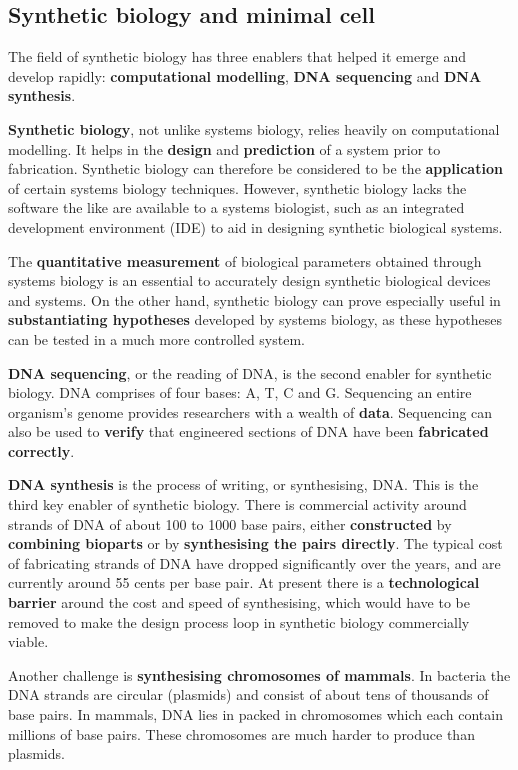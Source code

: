 \documentclass[10pt,a4paper]{report}
\begin{document}
	\subsection{Synthetic biology and minimal cell}
	The field of synthetic biology has three enablers that helped it emerge and develop rapidly: \textbf{computational modelling}, \textbf{DNA sequencing} and \textbf{DNA synthesis}.
	
	\textbf{Synthetic biology}, not unlike systems biology, relies heavily on computational modelling. 
	It helps in the \textbf{design} and \textbf{prediction} of a system prior to fabrication. 
	Synthetic biology can therefore be considered to be the \textbf{application} of certain systems biology techniques. 
	However, synthetic biology lacks the software the like are available to a systems biologist, such as an integrated development environment (IDE) to aid in designing synthetic biological systems.
	
	The \textbf{quantitative measurement} of biological parameters obtained through systems biology is an essential to accurately design synthetic biological devices and systems. On the other hand, synthetic biology can prove especially useful in \textbf{substantiating hypotheses} developed by systems biology, as these hypotheses can be tested in a much more controlled system.
	
	\textbf{DNA sequencing}, or the reading of DNA, is the second enabler for synthetic biology. DNA comprises of four bases: A, T, C and G. 
	Sequencing an entire organism’s genome provides researchers with a wealth of \textbf{data}. 
	Sequencing can also be used to \textbf{verify} that engineered sections of DNA have been \textbf{fabricated correctly}.
	
	\textbf{DNA synthesis} is the process of writing, or synthesising, DNA. 
	This is the third key enabler of synthetic biology. 
	There is commercial activity around strands of DNA of about 100 to 1000 base pairs, either \textbf{constructed} by \textbf{combining bioparts} or by \textbf{synthesising the pairs directly}. 
	The typical cost of fabricating strands of DNA have dropped significantly over the years, and are currently around 55 cents per base pair. 
	At present there is a \textbf{technological barrier} around the cost and speed of synthesising, which would have to be removed to make the design process loop in synthetic biology commercially viable.
	
	Another challenge is \textbf{synthesising chromosomes of mammals}. 
	In bacteria the DNA strands are circular (plasmids) and consist of about tens of thousands of base pairs. 
	In mammals, DNA lies in packed in chromosomes which each contain millions of base pairs. These chromosomes are much harder to produce than plasmids.
	
\end{document}
